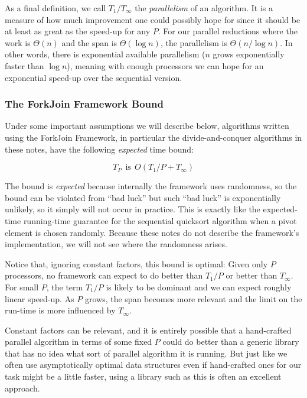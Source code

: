 \documentclass[10pt]{article}
\begin{document}
As a final definition, we call $T_1/T_\infty$ the \emph{parallelism}
of an algorithm.  It is a measure of how much improvement one could
possibly hope for since it should be at least as great as the speed-up
for any $P$.  For our parallel reductions where the work is $\Theta(n)$ and
the span is $\Theta(\log n)$, the parallelism is $\Theta(n/\log n)$.  In
other words, there is exponential available parallelism ($n$ grows
exponentially faster than $\log n$), meaning with enough processors we
can hope for an exponential speed-up over the sequential version.

\subsubsection{The ForkJoin Framework Bound}

Under some important assumptions we will describe below, algorithms
written using the ForkJoin Framework, in particular the
divide-and-conquer algorithms in these notes, have the following
\emph{expected} time bound:

\[ T_P\ \ \mbox{is}\ \ O(T_1/P + T_\infty) \]

The bound is \emph{expected} because internally the framework uses
randomness, so the bound can be violated from ``bad luck'' but such
``bad luck'' is exponentially unlikely, so it simply will not occur in
practice.  This is exactly like the expected-time running-time
guarantee for the sequential quicksort algorithm when a pivot element
is chosen randomly. Because these notes do not describe the
framework's implementation, we will not see where the randomness
arises.

Notice that, ignoring constant factors, this bound is optimal:
Given only $P$ processors, no framework can expect to do better than
$T_1/P$ or better than $T_\infty$.  For small $P$, the term $T_1/P$ is
likely to be dominant and we can expect roughly linear speed-up.  As
$P$ grows, the span becomes more relevant and the limit on the
run-time is more influenced by $T_\infty$.

Constant factors can be relevant, and it is entirely possible that a
hand-crafted parallel algorithm in terms of some fixed $P$ could do
better than a generic library that has no idea what sort of parallel
algorithm it is running.  But just like we often use asymptotically
optimal data structures even if hand-crafted ones for our task might
be a little faster, using a library such as this is often an excellent
approach.
\end{document}
